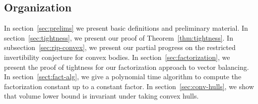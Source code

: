 \documentclass[11pt]{article}
\newcommand{\R}{{\mathbb{R}}}
\newcommand\eps{\varepsilon}
\newcommand{\eqdef}{\triangleq}
\DeclareMathOperator{\disc}{disc}
\DeclareMathOperator{\hd}{hd}
\DeclareMathOperator{\vb}{vb}
\begin{document}
\subsection{Organization}

In section~\ref{sec:prelims} we present basic definitions and preliminary
material. In section~\ref{sec:tightness}, we present our proof of
Theorem~\ref{thm:tightness}. In subsection~\ref{sec:rip-convex}, we present our
partial progress on the restricted invertibility conjecture for convex bodies.
In section~\ref{sec:factorization}, we present the proof of tightness for our
factorization approach to vector balancing. In section~\ref{sect:fact-alg}, we
give a polynomial time algorithm to compute the factorization constant up to a
constant factor. In section~\ref{sec:conv-hulls}, we show that volume lower
bound is invariant under taking convex hulls.  

% 
\end{document}
